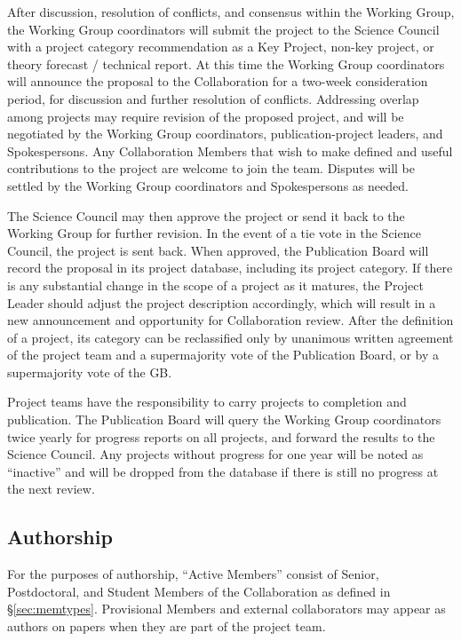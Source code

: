 \documentclass[12pt]{article}
\newcommand{\Comment}[1]{\textcolor{Blue}{(Comment: #1)}}
\begin{document}
After discussion, resolution of conflicts, and consensus within the Working Group, the Working Group coordinators will submit the project to the Science Council with a project category recommendation as a Key Project, non-key project, or theory forecast / technical report.  At this time the Working Group coordinators will announce the proposal to the Collaboration for a two-week consideration period, for discussion and further resolution of conflicts.  Addressing overlap among projects may require revision of the proposed project, and will be negotiated by the Working Group coordinators, publication-project leaders, and Spokespersons.  Any Collaboration Members that wish to make defined and useful contributions to the project are welcome to join the team.  Disputes will be settled by the Working Group coordinators and Spokespersons as needed.  

The Science Council may then approve the project or send it back to the Working Group for further revision.  In the event of a tie vote in the Science Council, the project is sent back.  When approved, the Publication Board will record the proposal in its project database, including its project category.  If there is any substantial change in the scope of a project as it matures, the Project Leader should adjust the project description accordingly, which will result in a new announcement and opportunity for Collaboration review.  After the definition of a project, its category can be reclassified only by unanimous written agreement of the project team and a supermajority vote of the Publication Board,  or by a supermajority vote of the GB.

Project teams have the responsibility to carry projects to completion and publication.  The Publication Board will query the Working Group coordinators twice yearly for progress reports on all projects, and forward the results to the Science Council.  Any projects without progress for one year will be noted as ``inactive'' and will be dropped from the database if there is still no progress at the next review.

\subsection{Authorship}

For the purposes of authorship, ``Active Members'' consist of Senior, Postdoctoral, and Student Members of the Collaboration as defined in \S\ref{sec:memtypes}.  Provisional Members and external collaborators may appear as authors on papers when they are part of the project team.
\end{document}
